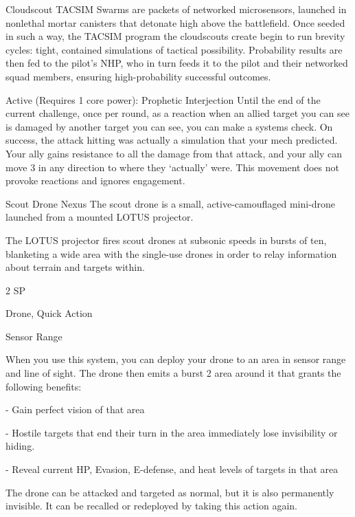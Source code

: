   Cloudscout TACSIM Swarms are packets of networked microsensors, launched in nonlethal mortar  
  canisters that detonate high above the battlefield. Once seeded in such a way, the TACSIM program the  
  cloudscouts create begin to run brevity cycles: tight, contained simulations of tactical possibility.  
  Probability results are then fed to the pilot’s NHP, who in turn feeds it to the pilot and their networked  
  squad members, ensuring high-probability successful outcomes.       

  Active (Requires 1 core power): Prophetic Interjection  
  Until the end of the current challenge, once per round, as a reaction when an allied target you can see  
  is damaged by another target you can see, you can make a systems check. On success, the attack  
  hitting was actually a simulation that your mech predicted. Your ally gains resistance to all the damage  
  from that attack, and your ally can move 3 in any direction to where they ‘actually’ were. This  
  movement does not provoke reactions and ignores engagement. 

Scout Drone Nexus  
The scout drone is a small, active-camouflaged mini-drone launched from a mounted LOTUS projector.  

The LOTUS projector fires scout drones at subsonic speeds in bursts of ten, blanketing a wide area with  
the single-use drones in order to relay information about terrain and targets within.    

2 SP
 
Drone, Quick Action
 

                                                                                                                 


Sensor Range
 
When you use this system, you can deploy your drone to an area in sensor range and line of  
sight. The drone then emits a burst 2 area around it that grants the following benefits:
 
  - Gain perfect vision of that area
 
  - Hostile targets that end their turn in the area immediately lose invisibility or hiding.
 
  - Reveal current HP, Evasion, E-defense, and heat levels of targets in that area
 
The drone can be attacked and targeted as normal, but it is also permanently invisible. It can be  
recalled or redeployed by taking this action again.
 

